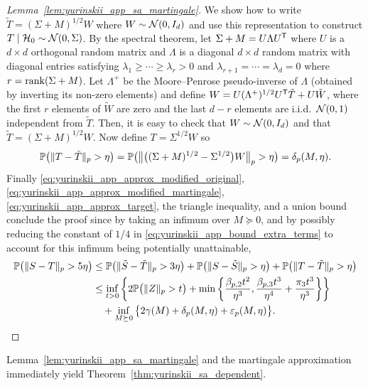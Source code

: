 \begin{proof}[Lemma~\ref{lem:yurinskii_app_sa_martingale}]
  We show how to write
  $\tilde T = (\Sigma + M)^{1/2} W$
  where $W \sim \cN(0,I_d)$
  and use this representation to construct
  $T \mid \cH_0 \sim \cN(0, \Sigma)$.
  By the spectral theorem, let $\Sigma + M = U \Lambda U^\T$
  where $U$ is a $d \times d$ orthogonal random matrix
  and $\Lambda$ is a diagonal $d \times d$ random matrix with
  diagonal entries satisfying
  $\lambda_1 \geq \cdots \geq \lambda_r > 0$
  and $\lambda_{r+1} = \cdots = \lambda_d = 0$
  where $r = \rank (\Sigma + M)$.
  Let $\Lambda^+$ be the Moore--Penrose pseudo-inverse of $\Lambda$
  (obtained by inverting its non-zero elements) and define
  $W = U (\Lambda^+)^{1/2} U^\T \tilde T + U \tilde W$, where
  the first $r$ elements of $\tilde W$ are zero
  and the last $d-r$ elements are i.i.d.\ $\cN(0,1)$
  independent from $\tilde T$.
  Then, it is easy to check that
  $W \sim \cN(0, I_d)$ and that
  $\tilde T = (\Sigma + M)^{1/2} W$.
  Now define $T = \Sigma^{1/2} W$ so
  \begin{equation}%
    \label{eq:yurinskii_app_approx_target}
    \P\big(\|T - \tilde T\|_p > \eta\big)
    = \P\big(\big\|\big((\Sigma + M)^{1/2}
    - \Sigma^{1/2} \big) W \big\|_p>\eta \big)
    = \delta_p(M, \eta).
  \end{equation}
  Finally
  \eqref{eq:yurinskii_app_approx_modified_original},
  \eqref{eq:yurinskii_app_approx_modified_martingale},
  \eqref{eq:yurinskii_app_approx_target},
  the triangle inequality,
  and a union bound conclude the proof since
  by taking an infimum over $M \succeq 0$,
  and by possibly reducing the constant of $1/4$ in
  \eqref{eq:yurinskii_app_bound_extra_terms} to account for
  this infimum being potentially unattainable,
  \begin{align*}
    \P\big(\|S-T\|_p > 5\eta\big)
    &\leq
    \P\big(\|\tilde S - \tilde T \|_p > 3\eta \big)
    +\P\big(\|S - \tilde S \|_p > \eta\big)
    +\P\big(\|T - \tilde T \|_p > \eta\big) \\
    &\leq
    \inf_{t>0}
    \left\{
      2 \P\big( \|Z\|_p > t \big)
      + \min\left\{
        \frac{\beta_{p,2} t^2}{\eta^3},
        \frac{\beta_{p,3} t^3}{\eta^4}
        + \frac{\pi_3 t^3}{\eta^3}
      \right\}
    \right\} \\
    &\quad+
    \inf_{M \succeq 0}
    \big\{ 2\gamma(M) + \delta_p(M,\eta)
    + \varepsilon_p(M, \eta)\big\}.
  \end{align*}
\end{proof}

Lemma~\ref{lem:yurinskii_app_sa_martingale} and the martingale approximation
immediately yield Theorem~\ref{thm:yurinskii_sa_dependent}.

